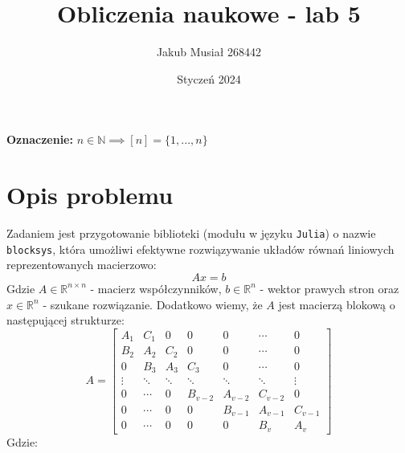 \documentclass[11pt]{article}
\title{Obliczenia naukowe - lab 5}
\author{Jakub Musiał 268442}
\date{Styczeń 2024}
\begin{document}
\maketitle

\hspace{1cm}

\noindent\textbf{Oznaczenie: } $n \in \mathbb{N} \implies [n] = \{1, ..., n\}$

\section*{Opis problemu}
    Zadaniem jest przygotowanie biblioteki (modułu w języku \texttt{Julia}) o nazwie \texttt{blocksys},
    która umożliwi efektywne rozwiązywanie układów równań liniowych reprezentowanych macierzowo:
    $$ Ax = b $$
    Gdzie $A \in \mathbb{R}^{n \times n}$ - macierz współczynników, $b \in \mathbb{R}^n$ - wektor prawych stron oraz
    $x \in \mathbb{R}^n$ - szukane rozwiązanie.
    \newline\newline
    Dodatkowo wiemy, że $A$ jest macierzą blokową o następującej strukturze:
    $$
    A =
    \begin{bmatrix}
    A_1    & C_1    & 0      & 0       & 0         & \dotsb  & 0       \\
    B_2    & A_2    & C_2    & 0       & 0         & \dotsb  & 0       \\
    0      & B_3    & A_3    & C_3     & 0         & \dotsb  & 0       \\
    \vdots & \ddots & \ddots & \ddots  & \ddots    & \ddots  & \vdots  \\
    0      & \dotsb & 0      & B_{v-2} & A_{v-2}   & C_{v-2} & 0       \\
    0      & \dotsb & 0      & 0       & B_{v-1}   & A_{v-1} & C_{v-1} \\
    0      & \dotsb & 0      & 0       & 0         & B_{v}   & A_{v}
    \end{bmatrix}
    $$
    Gdzie:
\end{document}
